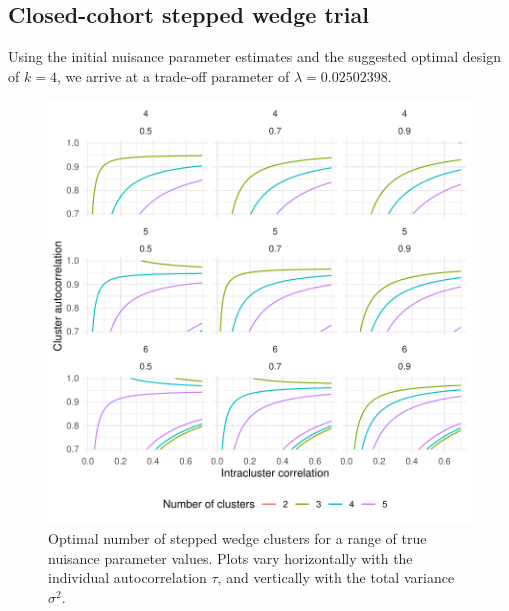 \documentclass[sagev, Crown]{sagej}
\begin{document}
\subsection{Closed-cohort stepped wedge trial}

Using the initial nuisance parameter estimates and the suggested optimal design of $k = 4$, we arrive at a trade-off parameter of $\lambda = 0.02502398$.

\begin{figure}
\centering
\includegraphics[scale=0.8]{./figures/opt_sw_k}
\caption{Optimal number of stepped wedge clusters for a range of true nuisance parameter values. Plots vary horizontally with the individual autocorrelation $\tau$, and vertically with the total variance $\sigma^2$.}
\label{fig:fixed_sw}
\end{figure}
\end{document}
